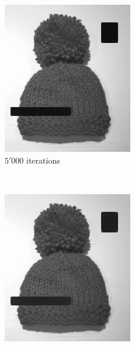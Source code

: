 \documentclass{paper}
\begin{document}
\begin{figure}[h]
\vspace{3mm}
\begin{subfigure}[h]{0.3\textwidth}
	\centering
	\includegraphics[width=\textwidth]{hat-iter5000-lambda10000-alpha0_0001}
	\caption*{$5'000$ iterations}
\end{subfigure}
~
\begin{subfigure}[h]{0.3\textwidth}
	\centering
	\includegraphics[width=\textwidth]{hat-iter10000-lambda10000-alpha0_0001}

\end{subfigure}
\end{figure}
\end{document}
